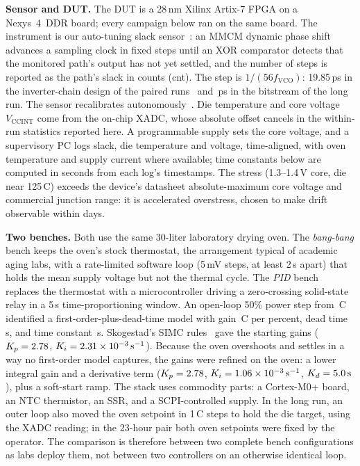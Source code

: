 \documentclass[10pt,twocolumn]{article}
\newcommand{\degC}{\,\textdegree C}
\newcommand{\unit}[1]{\,\mathrm{#1}}
\begin{document}
\textbf{Sensor and DUT.} The DUT is a 28\,nm Xilinx Artix-7 FPGA on a Nexys~4~DDR board; every campaign below ran on the same board. The instrument is our auto-tuning slack sensor~\cite{sbcci25}: an MMCM dynamic phase shift advances a sampling clock in fixed steps until an XOR comparator detects that the monitored path's output has not yet settled, and the number of steps is reported as the path's slack in counts (cnt). The step is $1/(56f_{\mathrm{VCO}})$: 19.85\,ps in the inverter-chain design of the paired runs~\cite{sbcci26} and \vPsRCA\,ps in the bitstream of the long run. The sensor recalibrates autonomously~\cite{sbcci25}. Die temperature and core voltage $V_{\mathrm{CCINT}}$ come from the on-chip XADC, whose absolute offset cancels in the within-run statistics reported here. A programmable supply sets the core voltage, and a supervisory PC logs slack, die temperature and voltage, time-aligned, with oven temperature and supply current where available; time constants below are computed in seconds from each log's timestamps. The stress (1.3--1.4\,V core, die near 125\degC) exceeds the device's datasheet absolute-maximum core voltage and commercial junction range: it is accelerated overstress, chosen to make drift observable within days.

\textbf{Two benches.} Both use the same 30-liter laboratory drying oven. The \emph{bang-bang} bench keeps the oven's stock thermostat, the arrangement typical of academic aging labs, with a rate-limited software loop (5\,mV steps, at least 2\,s apart) that holds the mean supply voltage but not the thermal cycle. The \emph{PID} bench replaces the thermostat with a microcontroller driving a zero-crossing solid-state relay in a 5\,s time-proportioning window. An open-loop 50\% power step from \vFopdtTzero\degC{} identified a first-order-plus-dead-time model with gain \vFopdtK\degC{} per percent, dead time \vFopdtTheta\,s, and time constant \vFopdtTau\,s. Skogestad's SIMC rules~\cite{simc} gave the starting gains ($K_p=2.78$, $K_i=\vSimcKiE\times10^{-3}\unit{s^{-1}}$). Because the oven overshoots and settles in a way no first-order model captures, the gains were refined on the oven: a lower integral gain and a derivative term ($K_p=2.78$, $K_i=\vFinalKiE\times10^{-3}\unit{s^{-1}}$, $K_d=\vFinalKd\unit{s}$), plus a soft-start ramp. The stack uses commodity parts: a Cortex-M0+ board, an NTC thermistor, an SSR, and a SCPI-controlled supply. In the long run, an outer loop also moved the oven setpoint in 1\degC{} steps to hold the die target, using the XADC reading; in the 23-hour pair both oven setpoints were fixed by the operator. The comparison is therefore between two complete bench configurations as labs deploy them, not between two controllers on an otherwise identical loop.
\end{document}
